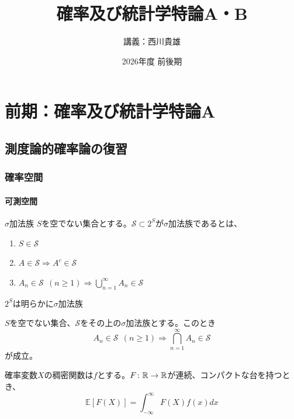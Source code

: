 \documentclass[dvipdfmx, leqno]{jsbook}
\title{確率及び統計学特論A・B}
\author{講義：西川貴雄}
\date{2026年度 前後期}
\begin{document}
\maketitle
\tableofcontents

\part{前期：確率及び統計学特論A}
\chapter{測度論的確率論の復習}
\section{確率空間}
\subsection{可測空間}
\begin{soudef}{$\sigma$加法族}
    $S$を空でない集合とする。$\mathcal{S}\subset 2^S$が$\sigma$加法族であるとは、
\begin{enumerate}
    \item $S\in \mathcal{S}$
    \item $A\in \mathcal{S}\Rightarrow A^c\in \mathcal{S}$
    \item $A_n\in \mathcal{S}\ \ (n\ge 1) \Rightarrow \bigcup_{n= 1}^\infty A_n\in \mathcal{S}$
\end{enumerate}
\end{soudef}

\begin{souexample}
    $2^S$は明らかに$\sigma$加法族
\end{souexample}

\begin{souprop}
    $S$を空でない集合、$\mathcal{S}$をその上の$\sigma$加法族とする。このとき
\begin{equation}
    A_n\in \mathcal{S}\ \ (n\ge 1)\Rightarrow \bigcap_{n= 1}^\infty A_n\in \mathcal{S}
\end{equation}
    が成立。
\end{souprop}
\begin{souremark}
    
\end{souremark}

%
%
%
%
%
%
%
\begin{souprop}
    確率変数$X$の稠密関数は$f$とする。$F\colon \mathbb{R}\to \mathbb{R}$が連続、コンパクトな台を持つとき、
\begin{equation} \label{eq:F:R-> R・連続・コンパクトな台を持つ}
\mathbb{E}[F(X)]= \int_{-\infty}^\infty F(X) f(x)dx
\end{equation}
\end{souprop}
\end{document}
